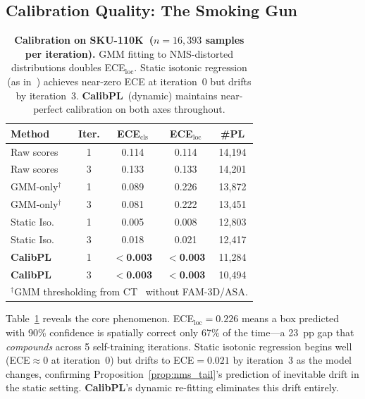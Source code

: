 \documentclass[10pt,twocolumn,letterpaper]{article}
\newcommand{\method}{\textbf{CalibPL}\xspace}
\newcommand{\sku}{\textsc{SKU-110K}\xspace}
\begin{document}
\subsection{Calibration Quality: The Smoking Gun}

\begin{table}[t]
  \centering
  \caption{\textbf{Calibration on \sku\ ($n{=}16{,}393$ samples per iteration).}
  GMM fitting to NMS-distorted distributions doubles ECE$_\text{loc}$.
  Static isotonic regression (as in~\cite{kuzucu2024calibration}) achieves
  near-zero ECE at iteration~0 but drifts by iteration~3.
  \method\ (dynamic) maintains near-perfect calibration on both axes throughout.}
  \vspace{2pt}
  \begin{tabular}{lcccc}
    \toprule
    Method & Iter. & ECE$_\text{cls}$ & ECE$_\text{loc}$ & \#PL \\
    \midrule
    Raw scores     & 1 & 0.114 & 0.114 & 14,194 \\
    Raw scores     & 3 & 0.133 & 0.133 & 14,201 \\
    GMM-only$^\dagger$ & 1 & 0.089 & 0.226 & 13,872 \\
    GMM-only$^\dagger$ & 3 & 0.081 & 0.222 & 13,451 \\
    Static Iso.~\cite{kuzucu2024calibration} & 1 & 0.005 & 0.008 & 12,803 \\
    Static Iso.~\cite{kuzucu2024calibration} & 3 & 0.018 & 0.021 & 12,417 \\
    \textbf{CalibPL}  & 1 & \textbf{$<$0.003} & \textbf{$<$0.003} & 11,284 \\
    \textbf{CalibPL}  & 3 & \textbf{$<$0.003} & \textbf{$<$0.003} & 10,494 \\
    \bottomrule
    \multicolumn{5}{l}{\footnotesize $^\dagger$GMM thresholding from CT~\cite{consistentteacher2023} without FAM-3D/ASA.}
  \end{tabular}
  \label{tab:calibration}
  \vspace{-4pt}
\end{table}

Table~\ref{tab:calibration} reveals the core phenomenon. ECE$_\text{loc}{=}0.226$
means a box predicted with 90\% confidence is spatially correct only 67\% of
the time---a 23~pp gap that \emph{compounds} across 5 self-training iterations.
Static isotonic regression begins well (ECE$\approx$0 at iteration~0) but drifts
to ECE${=}0.021$ by iteration~3 as the model changes, confirming Proposition~\ref{prop:nms_tail}'s
prediction of inevitable drift in the static setting. \method's dynamic
re-fitting eliminates this drift entirely.
\end{document}
